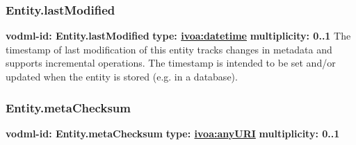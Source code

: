     \subsubsection{Entity.lastModified}
      \textbf{vodml-id: Entity.lastModified} \newline
      \textbf{type: \hyperref[sect:ivoa]{ivoa:datetime}} \newline
      \textbf{multiplicity: 0..1} \newline
      The timestamp of last modification of this entity tracks changes in metadata and supports incremental operations. The timestamp is intended to be set and/or updated when the entity is stored (e.g. in a database).

    \subsubsection{Entity.metaChecksum}
      \textbf{vodml-id: Entity.metaChecksum} \newline
      \textbf{type: \hyperref[sect:ivoa]{ivoa:anyURI}} \newline
      \textbf{multiplicity: 0..1} \newline
